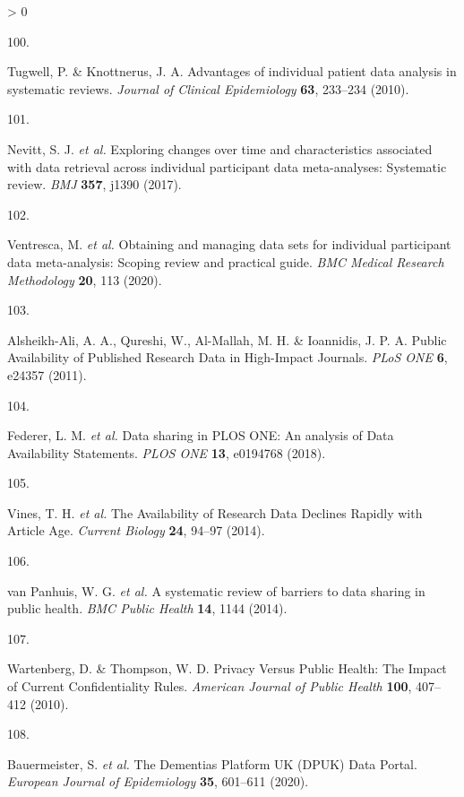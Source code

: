 \documentclass[a4paper, twoside]{templates/ociamthesis}
\newlength{\cslhangindent}
\newlength{\csllabelwidth}
\newenvironment{CSLReferences}[3] %
 {%
  \setlength{\parindent}{0pt}
  \ifodd #1 \everypar{\setlength{\hangindent}{\cslhangindent}}\ignorespaces\fi
  \ifnum #2 > 0
  \setlength{\parskip}{#2\baselineskip}
  \fi
 }%
 {}
\newcommand{\CSLLeftMargin}[1]{\parbox[t]{\maxof{\widthof{#1}}{\csllabelwidth}}{#1}}
\newcommand{\CSLRightInline}[1]{\parbox[t]{\linewidth - \csllabelwidth}{#1}}
\begin{document}
\begin{CSLReferences}{0}{0}
\leavevmode\hypertarget{ref-tugwell2010}{}%
\CSLLeftMargin{100. }
\CSLRightInline{Tugwell, P. \& Knottnerus, J. A. Advantages of individual patient data analysis in systematic reviews. \emph{Journal of Clinical Epidemiology} \textbf{63}, 233--234 (2010).}

\leavevmode\hypertarget{ref-nevitt2017}{}%
\CSLLeftMargin{101. }
\CSLRightInline{Nevitt, S. J. \emph{et al.} Exploring changes over time and characteristics associated with data retrieval across individual participant data meta-analyses: Systematic review. \emph{BMJ} \textbf{357}, j1390 (2017).}

\leavevmode\hypertarget{ref-ventresca2020}{}%
\CSLLeftMargin{102. }
\CSLRightInline{Ventresca, M. \emph{et al.} Obtaining and managing data sets for individual participant data meta-analysis: Scoping review and practical guide. \emph{BMC Medical Research Methodology} \textbf{20}, 113 (2020).}

\leavevmode\hypertarget{ref-alsheikh-ali2011}{}%
\CSLLeftMargin{103. }
\CSLRightInline{Alsheikh-Ali, A. A., Qureshi, W., Al-Mallah, M. H. \& Ioannidis, J. P. A. Public {Availability} of {Published Research Data} in {High}-{Impact Journals}. \emph{PLoS ONE} \textbf{6}, e24357 (2011).}

\leavevmode\hypertarget{ref-federer2018}{}%
\CSLLeftMargin{104. }
\CSLRightInline{Federer, L. M. \emph{et al.} Data sharing in {PLOS ONE}: An analysis of {Data Availability Statements}. \emph{PLOS ONE} \textbf{13}, e0194768 (2018).}

\leavevmode\hypertarget{ref-vines2014}{}%
\CSLLeftMargin{105. }
\CSLRightInline{Vines, T. H. \emph{et al.} The {Availability} of {Research Data Declines Rapidly} with {Article Age}. \emph{Current Biology} \textbf{24}, 94--97 (2014).}

\leavevmode\hypertarget{ref-vanpanhuis2014}{}%
\CSLLeftMargin{106. }
\CSLRightInline{van Panhuis, W. G. \emph{et al.} A systematic review of barriers to data sharing in public health. \emph{BMC Public Health} \textbf{14}, 1144 (2014).}

\leavevmode\hypertarget{ref-wartenberg2010}{}%
\CSLLeftMargin{107. }
\CSLRightInline{Wartenberg, D. \& Thompson, W. D. Privacy {Versus Public Health}: The {Impact} of {Current Confidentiality Rules}. \emph{American Journal of Public Health} \textbf{100}, 407--412 (2010).}

\leavevmode\hypertarget{ref-bauermeister2020}{}%
\CSLLeftMargin{108. }
\CSLRightInline{Bauermeister, S. \emph{et al.} The {Dementias Platform UK} ({DPUK}) {Data Portal}. \emph{European Journal of Epidemiology} \textbf{35}, 601--611 (2020).}


\end{CSLReferences}
\end{document}
